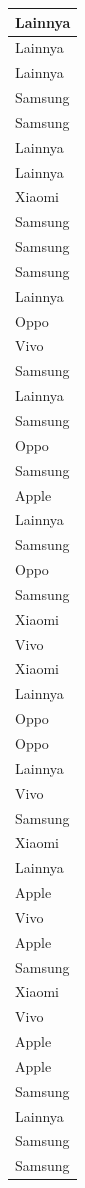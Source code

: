 \documentclass[
  letterpaper,
  DIV=11,
  numbers=noendperiod]{scrartcl}
\begin{document}
\begin{table}
\begin{tabular}[t]{l}
\hline
Lainnya\\
\hline
Lainnya\\
\hline
Lainnya\\
\hline
Samsung\\
\hline
Samsung\\
\hline
Lainnya\\
\hline
Lainnya\\
\hline
Xiaomi\\
\hline
Samsung\\
\hline
Samsung\\
\hline
Samsung\\
\hline
Lainnya\\
\hline
Oppo\\
\hline
Vivo\\
\hline
Samsung\\
\hline
Lainnya\\
\hline
Samsung\\
\hline
Oppo\\
\hline
Samsung\\
\hline
Apple\\
\hline
Lainnya\\
\hline
Samsung\\
\hline
Oppo\\
\hline
Samsung\\
\hline
Xiaomi\\
\hline
Vivo\\
\hline
Xiaomi\\
\hline
Lainnya\\
\hline
Oppo\\
\hline
Oppo\\
\hline
Lainnya\\
\hline
Vivo\\
\hline
Samsung\\
\hline
Xiaomi\\
\hline
Lainnya\\
\hline
Apple\\
\hline
Vivo\\
\hline
Apple\\
\hline
Samsung\\
\hline
Xiaomi\\
\hline
Vivo\\
\hline
Apple\\
\hline
Apple\\
\hline
Samsung\\
\hline
Lainnya\\
\hline
Samsung\\
\hline
Samsung\\

\end{tabular}
\end{table}
\end{document}
